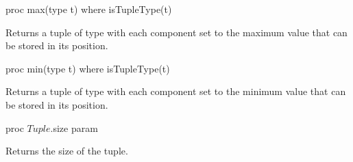\begin{protohead}
proc max(type t) where isTupleType(t)
\end{protohead}
\begin{protobody}
Returns a tuple of type  with each component set to the maximum
value that can be stored in its position.
\end{protobody}

\begin{protohead}
proc min(type t) where isTupleType(t)
\end{protohead}
\begin{protobody}
Returns a tuple of type  with each component set to the minimum
value that can be stored in its position.
\end{protobody}

\begin{protohead}
proc $Tuple$.size param
\end{protohead}
\begin{protobody}
Returns the size of the tuple.
\end{protobody}
